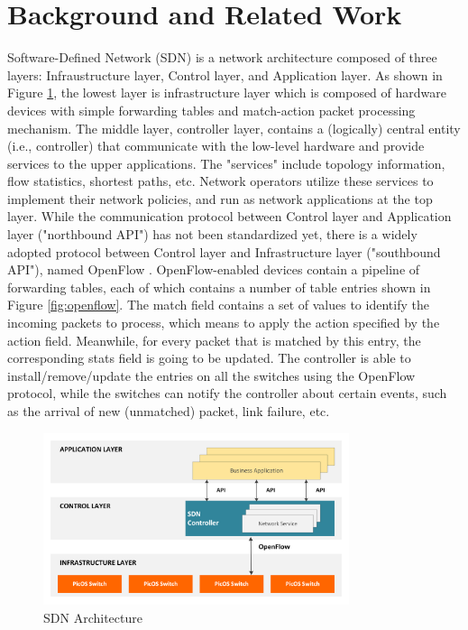 \documentclass[12pt]{article}
\begin{document}
\section{Background and Related Work}
Software-Defined Network (SDN) is a network architecture composed of three layers: Infraustructure layer, Control layer, and Application layer. As shown in Figure \ref{fig:arch}, the lowest layer is infrastructure layer which is composed of hardware devices with simple forwarding tables and match-action packet processing mechanism. The middle layer, controller layer, contains a (logically) central entity (i.e., controller) that communicate with the low-level hardware and provide services to the upper applications. The "services" include topology information, flow statistics, shortest paths, etc. Network operators utilize these services to implement their network policies, and run as network applications at the top layer. While the communication protocol between Control layer and Application layer ("northbound API") has not been standardized yet, there is a widely adopted protocol between Control layer and Infrastructure layer ("southbound API"), named OpenFlow \cite{openflow}. OpenFlow-enabled devices contain a pipeline of forwarding tables, each of which contains a number of table entries shown in Figure \ref{fig:openflow}. The match field contains a set of values to identify the incoming packets to process, which means to apply the action specified by the action field. Meanwhile, for every packet that is matched by this entry, the corresponding stats field is going to be updated. The controller is able to install/remove/update the entries on all the switches using the OpenFlow protocol, while the switches can notify the controller about certain events, such as the arrival of new (unmatched) packet, link failure, etc. 

\begin{figure}
  \centering
  \includegraphics[width=0.8\textwidth]{arch.png}
  \caption{SDN Architecture}
  \label{fig:arch}
\end{figure}
\end{document}
